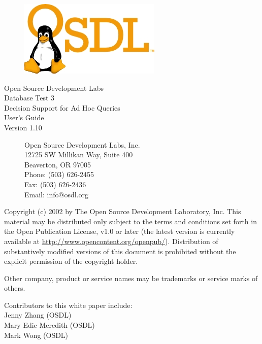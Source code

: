 \documentclass{article}
\begin{document}
\begin{titlepage}

\begin{figure}[t]
\centering
\includegraphics[scale=1]{osdl-logo.png}
\end{figure}

\centering
\huge
Open Source Development Labs \\
Database Test 3 \\
Decision Support for Ad Hoc Queries \\
\huge
User's Guide \\
\large
Version 1.10

\begin{figure}[b]
\flushleft
\normalsize
Open Source Development Labs, Inc. \\
12725 SW Millikan Way, Suite 400 \\
Beaverton, OR 97005 \\
Phone: (503) 626-2455 \\
Fax: (503) 626-2436 \\
Email: info@osdl.org
\end{figure}

\end{titlepage}

\noindent
Copyright (c) 2002 by The Open Source Development Laboratory, Inc. This
material may be distributed only subject to the terms and conditions set forth
in the Open Publication License, v1.0 or later (the latest version is currently
available at \url{http://www.opencontent.org/openpub/}). Distribution of
substantively modified versions of this document is prohibited without the
explicit permission of the copyright holder.

\noindent
Other company, product or service names may be trademarks or service marks of
others.

\noindent
Contributors to this white paper include: \\
\indent Jenny Zhang (OSDL) \\
\indent Mary Edie Meredith (OSDL) \\
\indent Mark Wong (OSDL) \\
\end{document}
